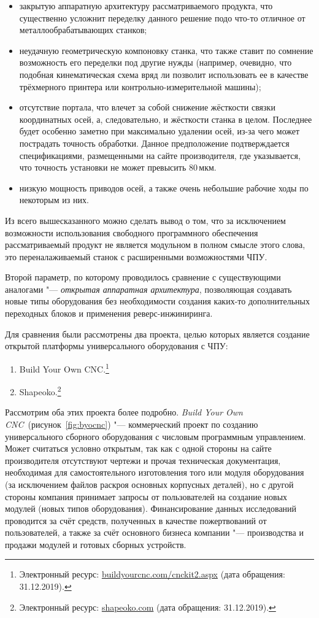 \begin{itemize}
	\item закрытую аппаратную архитектуру рассматриваемого продукта, что существенно усложнит переделку данного решение подо что-то отличное от металлообрабатывающих станков;
	\item неудачную геометрическую компоновку станка, что также ставит по сомнение возможность его переделки под другие нужды (например, очевидно, что подобная кинематическая схема вряд ли позволит использовать ее в качестве трёхмерного принтера или контрольно-измерительной машины);
	\item отсутствие портала, что влечет за собой снижение жёсткости связки координатных осей, а, следовательно, и жёсткости станка в целом. Последнее будет особенно заметно при максимально удалении осей, из-за чего может пострадать точность обработки. Данное предположение подтверждается спецификациями, размещенными на сайте производителя, где указывается, что точность установки не может превысить 80\,мкм.
	\item низкую мощность приводов осей, а также очень небольшие рабочие ходы по некоторым из них.
\end{itemize}

Из всего вышесказанного можно сделать вывод о том, что за исключением возможности использования свободного программного обеспечения рассматриваемый продукт не является модульном в полном смысле этого слова, это переналаживаемый станок с расширенными возможностями ЧПУ.

Второй параметр, по которому проводилось сравнение с существующими аналогами "--- \textit{открытая аппаратная архитектура}, позволяющая создавать новые типы оборудования без необходимости создания каких-то дополнительных переходных блоков и применения реверс-инжиниринга.

Для сравнения были рассмотрены два проекта, целью которых является создание открытой платформы универсального оборудования с ЧПУ:

\begin{enumerate}
	\item Build Your Own CNC.\footnote{Электронный ресурс: {\small\url{buildyourcnc.com/cnckit2.aspx}} (дата обращения: 31.12.2019).}
	\item Shapeoko.\footnote{Электронный ресурс: {\small\url{shapeoko.com}} (дата обращения: 31.12.2019).}
\end{enumerate}

Рассмотрим оба этих проекта более подробно. \textit{Build Your Own CNC}~(рисунок~\cref{fig:byocnc}) "--- коммерческий проект по созданию универсального сборного оборудования с числовым программным управлением. Может считаться условно открытым, так как с одной стороны на сайте производителя отсутствуют чертежи и прочая техническая документация, необходимая для самостоятельного изготовления того или модуля оборудования (за исключением файлов раскроя основных корпусных деталей), но с другой стороны компания принимает запросы от пользователей на создание новых модулей (новых типов оборудования). Финансирование данных исследований проводится за счёт средств, полученных в качестве пожертвований от пользователей, а также за счёт основного бизнеса компании "--- производства и продажи модулей и готовых сборных устройств.

